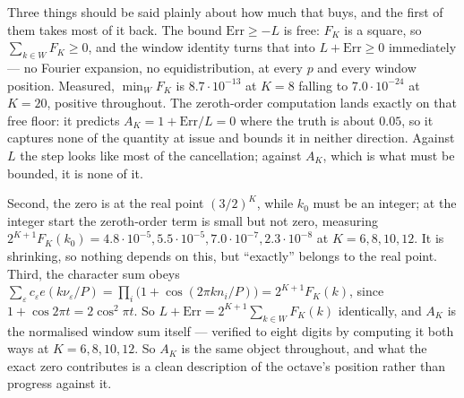 \documentclass[11pt]{article}
\theoremstyle{remark}
\newcommand{\eps}{\varepsilon}
\begin{document}
Three things should be said plainly about how much that buys, and the first of them takes most of it
back. The bound $\mathrm{Err}\ge-L$ is free: $F_K$ is a square, so $\sum_{k\in W}F_K\ge0$, and the window
identity turns that into $L+\mathrm{Err}\ge0$ immediately --- no Fourier expansion, no equidistribution,
at every $p$ and every window position. Measured, $\min_WF_K$ is $8.7\cdot10^{-13}$ at $K=8$ falling to
$7.0\cdot10^{-24}$ at $K=20$, positive throughout. The zeroth-order computation lands exactly on that
free floor: it predicts $A_K=1+\mathrm{Err}/L=0$ where the truth is about $0.05$, so it captures none of
the quantity at issue and bounds it in neither direction. Against $L$ the step looks like most of the
cancellation; against $A_K$, which is what must be bounded, it is none of it.

Second, the zero is at the real point
$(3/2)^K$, while $k_0$ must be an integer; at the integer start the zeroth-order term is small but not
zero, measuring $2^{K+1}F_K(k_0)=4.8\cdot10^{-5},5.5\cdot10^{-5},7.0\cdot10^{-7},2.3\cdot10^{-8}$ at
$K=6,8,10,12$. It is shrinking, so nothing depends on this, but ``exactly'' belongs to the real point.
Third, the character sum obeys
$\sum_\eps c_\eps e(k\nu_\eps/P)=\prod_i\bigl(1+\cos(2\pi kn_i/P)\bigr)=2^{K+1}F_K(k)$, since
$1+\cos2\pi t=2\cos^2\pi t$. So $L+\mathrm{Err}=2^{K+1}\sum_{k\in W}F_K(k)$ identically, and $A_K$ is the
normalised window sum itself --- verified to eight digits by computing it both ways at $K=6,8,10,12$.
So $A_K$ is the same object throughout, and what the exact zero contributes is a clean description of the
octave's position rather than progress against it.
\end{document}
